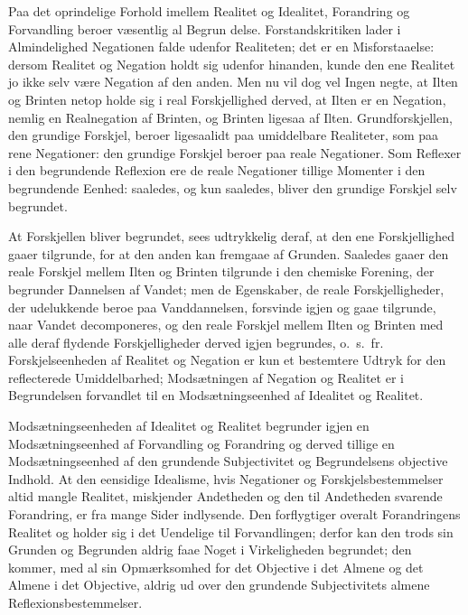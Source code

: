\documentclass[12pt]{book}
\newcommand{\opage}[1]{\marginnote{\footnotesize\textit{[#1]}}}
\begin{document}
Paa det oprindelige Forhold imellem Realitet og Idealitet, Forandring og Forvandling
beroer væsentlig al Begrun%
\opage{98} delse. Forstandskritiken lader i Almindelighed Negationen falde udenfor Realiteten;
det er en Misforstaaelse: dersom Realitet og Negation holdt sig udenfor hinanden,
kunde den ene Realitet jo ikke selv være Negation af den anden. Men nu vil dog vel
Ingen negte, at Ilten og Brinten netop holde sig i real Forskjellighed derved, at
Ilten er en Negation, nemlig en Realnegation af Brinten, og Brinten ligesaa af Ilten.
Grundforskjellen, den grundige Forskjel, beroer ligesaalidt paa umiddelbare
Realiteter, som paa rene Negationer: den grundige Forskjel beroer paa reale
Negationer. Som Reflexer i den begrundende Reflexion ere de reale Negationer tillige
Momenter i den begrundende Eenhed: saaledes, og kun saaledes, bliver den grundige
Forskjel selv begrundet.

At Forskjellen bliver begrundet, sees udtrykkelig deraf, at den ene Forskjellighed
gaaer tilgrunde, for at den anden kan fremgaae af Grunden. Saaledes gaaer den reale
Forskjel mellem Ilten og Brinten tilgrunde i den chemiske Forening, der begrunder
Dannelsen af Vandet; men de Egenskaber, de reale Forskjelligheder, der udelukkende
beroe paa Vanddannelsen, forsvinde igjen og gaae tilgrunde, naar Vandet decomponeres,
og den reale Forskjel mellem Ilten og Brinten med alle deraf flydende Forskjelligheder
derved igjen begrundes, o.\ s.\ fr. Forskjelseenheden af Realitet og Negation er kun
et bestemtere Udtryk for den reflecterede Umiddelbarhed; Modsætningen af Negation og
Realitet er i Begrundelsen forvandlet til en Modsætningseenhed af Idealitet og
Realitet.

Modsætningseenheden af Idealitet og Realitet begrunder igjen en Modsætningseenhed af
Forvandling og Forandring og derved tillige en Modsætningseenhed af den grundende
Subjectivitet og Begrundelsens objective Indhold. At den eensidige Idealisme, hvis
Negationer og Forskjelsbestemmelser altid mangle Realitet, miskjender Andetheden og
den til Andetheden svarende Forandring, er fra mange Sider indlysende. Den
forflygtiger overalt Forandringens Realitet og holder sig
\opage{99} i det Uendelige til Forvandlingen; derfor kan den trods sin Grunden og Begrunden
aldrig faae Noget i Virkeligheden begrundet; den kommer, med al sin Opmærksomhed for
det Objective i det Almene og det Almene i det Objective, aldrig ud over den grundende
Subjectivitets almene Reflexionsbestemmelser.
\end{document}

